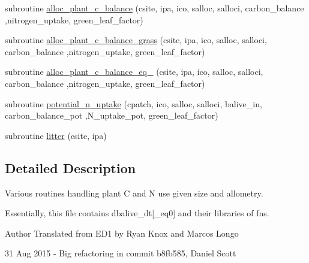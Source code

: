 \begin{DoxyCompactItemize}
subroutine \hyperlink{namespacegrowth__balive_aa34feeb938e58aab6d26db893e10aff3}{alloc\+\_\+plant\+\_\+c\+\_\+balance} (csite, ipa, ico, salloc, salloci, carbon\+\_\+balance                                                                                                                                                                                   ,nitrogen\+\_\+uptake, green\+\_\+leaf\+\_\+factor)
\item 
subroutine \hyperlink{namespacegrowth__balive_ab77d0ec4f42b787f4ea60352eb81e7ef}{alloc\+\_\+plant\+\_\+c\+\_\+balance\+\_\+grass} (csite, ipa, ico, salloc, salloci, carbon\+\_\+balance                                                                                                                                                           ,nitrogen\+\_\+uptake, green\+\_\+leaf\+\_\+factor)
\item 
subroutine \hyperlink{namespacegrowth__balive_a1990f1f2512a5c36c291f32fb7cc8669}{alloc\+\_\+plant\+\_\+c\+\_\+balance\+\_\+eq\+\_} (csite, ipa, ico, salloc, salloci, carbon\+\_\+balance                                                                                                                                                                                   ,nitrogen\+\_\+uptake, green\+\_\+leaf\+\_\+factor)
\item 
subroutine \hyperlink{namespacegrowth__balive_a4e594938a177edfffccb92437a01074f}{potential\+\_\+n\+\_\+uptake} (cpatch, ico, salloc, salloci, balive\+\_\+in, carbon\+\_\+balance\+\_\+pot                                                                                                                                       ,N\+\_\+uptake\+\_\+pot, green\+\_\+leaf\+\_\+factor)
\item 
subroutine \hyperlink{namespacegrowth__balive_affc86c9f292d8fa6d67dfe1d0df69337}{litter} (csite, ipa)
\end{DoxyCompactItemize}


\subsection{Detailed Description}
Various routines handling plant C and N use given size and allometry. 

Essentially, this file contains dbalive\+\_\+dt\mbox{[}\+\_\+eq0\mbox{]} and their libraries of fns. \begin{DoxyAuthor}{Author}
Translated from E\+D1 by Ryan Knox and Marcos Longo 

31 Aug 2015 -\/ Big refactoring in commit b8fb585, Daniel Scott 
\end{DoxyAuthor}


